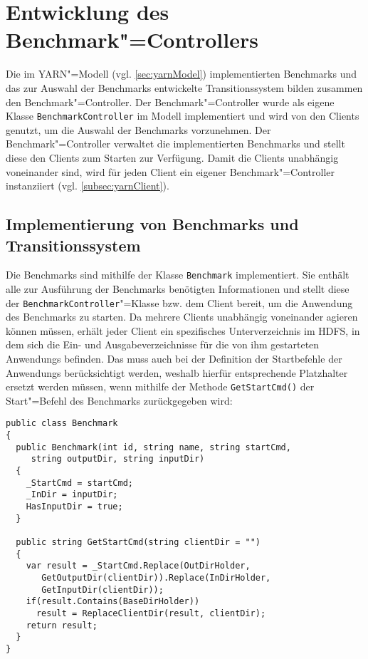 \section{Entwicklung des Benchmark"=Controllers}
\label{sec:benchmarkController}

Die im \gls{YARN}"=Modell (vgl. \cref{sec:yarnModel}) implementierten Benchmarks und das zur Auswahl der Benchmarks entwickelte Transitionssystem bilden zusammen den Benchmark"=Controller.
Der Benchmark"=Controller wurde als eigene Klasse \texttt{BenchmarkController} im Modell implementiert und wird von den Clients genutzt, um die Auswahl der Benchmarks vorzunehmen.
Der Benchmark"=Controller verwaltet die implementierten Benchmarks und stellt diese den Clients zum Starten zur Verfügung.
Damit die Clients unabhängig voneinander sind, wird für jeden Client ein eigener Benchmark"=Controller instanziiert (vgl. \cref{subsec:yarnClient}).

\subsection{Implementierung von Benchmarks und Transitionssystem}
\label{subsec:appImplementation}

Die Benchmarks sind mithilfe der Klasse \texttt{Benchmark} implementiert.
Sie enthält alle zur Ausführung der Benchmarks benötigten Informationen und stellt diese der \texttt{BenchmarkController}"=Klasse bzw. dem Client bereit, um die \gls{Anwendung} des Benchmarks zu starten.
Da mehrere Clients unabhängig voneinander agieren können müssen, erhält jeder Client ein spezifisches Unterverzeichnis im \gls{HDFS}, in dem sich die Ein- und Ausgabeverzeichnisse für die von ihm gestarteten \glspl{Anwendung} befinden.
Das muss auch bei der Definition der Startbefehle der \glspl{Anwendung} berücksichtigt werden, weshalb hierfür entsprechende Platzhalter ersetzt werden müssen, wenn mithilfe der Methode \texttt{GetStartCmd()} der Start"=Befehl des Benchmarks zurückgegeben wird:

\begin{lstlisting}[label=lst:benchmarkClass,style=cs,
caption={[Wesentliche Methoden der Klasse Benchmark]
    Wesentliche Methoden der Klasse \texttt{Benchmark}}]
public class Benchmark
{
  public Benchmark(int id, string name, string startCmd,
     string outputDir, string inputDir)
  {
    _StartCmd = startCmd;
    _InDir = inputDir;
    HasInputDir = true;
  }
  
  public string GetStartCmd(string clientDir = "")
  {
    var result = _StartCmd.Replace(OutDirHolder,
       GetOutputDir(clientDir)).Replace(InDirHolder,
       GetInputDir(clientDir));
    if(result.Contains(BaseDirHolder))
      result = ReplaceClientDir(result, clientDir);
    return result;
  }
}
\end{lstlisting}

